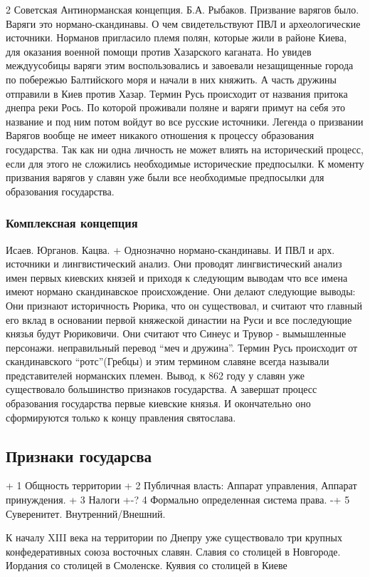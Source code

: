 \documentclass[a4paper]{article}
\begin{document}
2   Советская Антинорманская концепция. Б.А. Рыбаков.
    Призвание варягов было. Варяги это нормано-скандинавы. О чем свидетельствуют ПВЛ и археологические источники. Норманов пригласило племя полян, которые жили в районе Киева, для оказания военной помощи против Хазарского каганата. Но увидев междуусобицы варяги этим воспользовались и завоевали незащищенные города по побережью Балтийского моря и начали в них княжить. А часть дружины отправили в Киев против Хазар.
    Термин Русь происходит от названия притока днепра реки Рось.
    По которой проживали поляне и варяги примут на себя это название и под ним потом войдут во все русские источники. Легенда о призвании Варягов вообще не имеет никакого отношения к процессу образования государства. Так как ни одна личность не может влиять на исторический процесс, если для этого не сложились необходимые исторические предпосылки. К моменту призвания варягов у славян уже были все необходимые предпосылки для образования государства.
\subsubsection{Комплексная концепция}
    Исаев. Юрганов. Кацва. 
    + Однозначно нормано-скандинавы. И ПВЛ и арх. источники и лингвистический анализ. Они проводят лингвистический анализ имен первых киевских князей и приходя к следующим выводам что все имена имеют нормано скандинавское происхождение. Они делают следующие выводы:
        Они признают историчность Рюрика, что он существовал, и считают что главный его вклад в основании первой княжеской династии на Руси и все последующие князья будут Рюриковичи. Они считают что Синеус и Трувор - вымышленные персонажи. неправильный перевод ``меч и дружина''.
    Термин Русь происходит от скандинавского ``ротс''(Гребцы) и этим термином славяне всегда называли представителей норманских племен.
    Вывод, к 862 году у славян уже существовало большинство признаков государства. А завершат процесс образования государства первые киевские князья. И окончательно оно сформируются только к концу правления святослава.
\subsection{Признаки государсва}
+ 1 Общность территории
+ 2 Публичная власть: Аппарат управления, Аппарат принуждения.
+ 3 Налоги
+-? 4 Формально определенная система права.
-+ 5 Суверенитет. Внутренний/Внешний.

К началу XIII века на территории по Днепру уже существовало три крупных конфедеративных союза восточных славян. 
    Славия со столицей в Новгороде. 
    Иордания со столицей в Смоленске. 
    Куявия со столицей в Киеве
\end{document}
